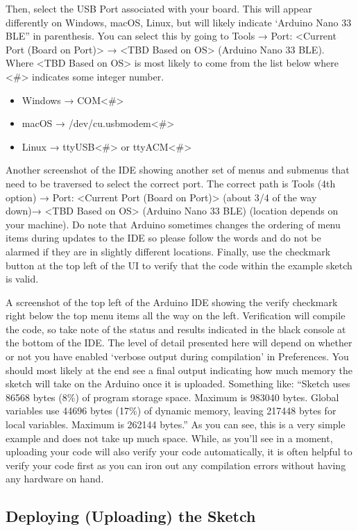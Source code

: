 Then, select the USB Port associated with your board. This will appear differently on Windows, macOS, Linux, but will likely indicate ‘Arduino Nano 33 BLE” in parenthesis. You can select this by going to Tools → Port: <Current Port (Board on Port)> → <TBD Based on OS> (Arduino Nano 33 BLE). Where <TBD Based on OS> is most likely to come from the list below where <\#> indicates some integer number.

\begin{itemize}
  \item Windows → COM<\#>
  \item macOS → /dev/cu.usbmodem<\#>
  \item Linux → ttyUSB<\#> or ttyACM<\#>
\end{itemize}

Another screenshot of the IDE showing another set of menus and submenus that need to be traversed to select the correct port. The correct path is Tools (4th option) → Port: <Current Port (Board on Port)> (about 3/4 of the way down)→ <TBD Based on OS> (Arduino Nano 33 BLE) (location depends on your machine). Do note that Arduino sometimes changes the ordering of menu items during updates to the IDE so please follow the words and do not be alarmed if they are in slightly different locations.
Finally, use the checkmark button at the top left of the UI to verify that the code within the example sketch is valid. 

A screenshot of the top left of the Arduino IDE showing the verify checkmark right below the top menu items all the way on the left.
Verification will compile the code, so take note of the status and results indicated in the black console at the bottom of the IDE. The level of detail presented here will depend on whether or not you have enabled ‘verbose output during compilation’ in Preferences. You should most likely at the end see a final output indicating how much memory the sketch will take on the Arduino once it is uploaded. Something like: “Sketch uses 86568 bytes (8\%) of program storage space. Maximum is 983040 bytes. Global variables use 44696 bytes (17\%) of dynamic memory, leaving 217448 bytes for local variables. Maximum is 262144 bytes.” As you can see, this is a very simple example and does not take up much space. While, as you’ll see in a moment, uploading your code will also verify your code automatically, it is often helpful to verify your code first as you can iron out any compilation errors without having any hardware on hand.

\subsection{Deploying (Uploading) the Sketch}
    
